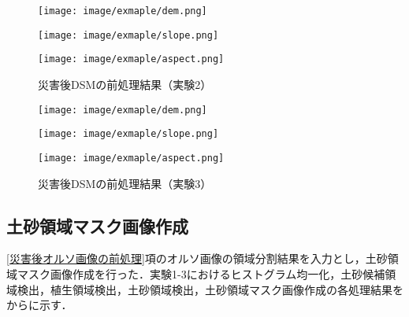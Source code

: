       \begin{figure}[t]
        \begin{minipage}[c]{0.329\hsize}
          \centering
          \texttt{[image: image/exmaple/dem.png]}
        \end{minipage}
        \begin{minipage}[c]{0.329\hsize}
          \centering
          \texttt{[image: image/exmaple/slope.png]}
        \end{minipage}
        \begin{minipage}[c]{0.329\hsize}
          \centering
          \texttt{[image: image/exmaple/aspect.png]}
        \end{minipage}
        \caption{災害後DSMの前処理結果（実験2）}
      \end{figure}

      \begin{figure}[t]
        \begin{minipage}[c]{0.329\hsize}
          \centering
          \texttt{[image: image/exmaple/dem.png]}
        \end{minipage}
        \begin{minipage}[c]{0.329\hsize}
          \centering
          \texttt{[image: image/exmaple/slope.png]}
        \end{minipage}
        \begin{minipage}[c]{0.329\hsize}
          \centering
          \texttt{[image: image/exmaple/aspect.png]}
        \end{minipage}
        \caption{災害後DSMの前処理結果（実験3）}
        \label{災害後DSMの前処理結果（実験3）}
      \end{figure}


    \subsection{土砂領域マスク画像作成}
      \label{土砂領域マスク画像作成（実験）}
      \ref{災害後オルソ画像の前処理}項のオルソ画像の領域分割結果を入力とし，土砂領域マスク画像作成を行った．実験1-3におけるヒストグラム均一化，土砂候補領域検出，植生領域検出，土砂領域検出，土砂領域マスク画像作成の各処理結果をからに示す．

